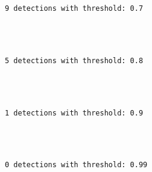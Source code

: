 \documentclass[11pt]{article}
\begin{document}
    \begin{Verbatim}[commandchars=\\\{\}]
9 detections with threshold: 0.7


    \end{Verbatim}

    \begin{center}
    \end{center}
    { \hspace*{\fill} \\}
    
    \begin{Verbatim}[commandchars=\\\{\}]
5 detections with threshold: 0.8


    \end{Verbatim}

    \begin{center}
    \end{center}
    { \hspace*{\fill} \\}
    
    \begin{Verbatim}[commandchars=\\\{\}]
1 detections with threshold: 0.9


    \end{Verbatim}

    \begin{center}
    \end{center}
    { \hspace*{\fill} \\}
    
    \begin{Verbatim}[commandchars=\\\{\}]
0 detections with threshold: 0.99


    \end{Verbatim}

    \begin{center}
    \end{center}
    { \hspace*{\fill} \\}
    
\end{document}
